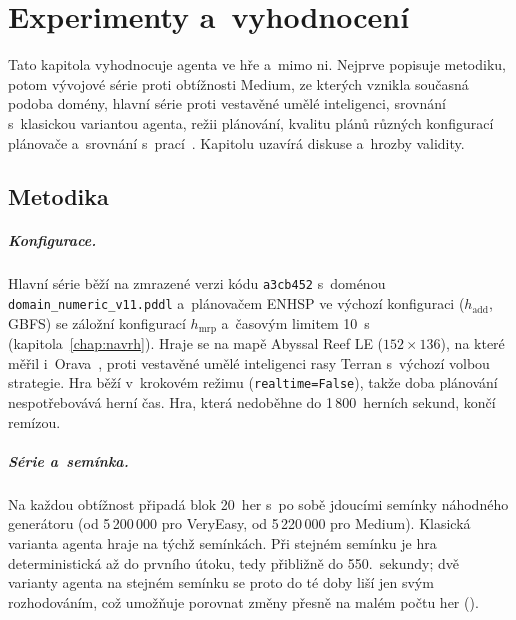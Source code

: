 \chapter{Experimenty a~vyhodnocení}
\label{chap:experimenty}


Tato kapitola vyhodnocuje agenta ve hře a~mimo ni. Nejprve popisuje metodiku, potom vývojové série proti obtížnosti Medium, ze kterých vznikla současná podoba domény, hlavní série proti vestavěné umělé inteligenci, srovnání s~klasickou variantou agenta, režii plánování, kvalitu plánů různých konfigurací plánovače a~srovnání s~prací~\cite{Orava2025}. Kapitolu uzavírá diskuse a~hrozby validity.

\section{Metodika}
\label{sec:metodika}

\paragraph{Konfigurace.} Hlavní série běží na zmrazené verzi kódu \texttt{a3cb452} s~doménou \texttt{domain\_numeric\_v11.pddl} a~plánovačem ENHSP ve výchozí konfiguraci ($h_{\mathrm{add}}$, GBFS) se záložní konfigurací $h_{\mathrm{mrp}}$ a~časovým limitem 10~s (kapitola~\ref{chap:navrh}). Hraje se na mapě Abyssal Reef LE ($152 \times 136$), na které měřil i~Orava~\cite{Orava2025}, proti vestavěné umělé inteligenci rasy Terran s~výchozí volbou strategie. Hra běží v~krokovém režimu (\texttt{realtime=False}), takže doba plánování nespotřebovává herní čas. Hra, která nedoběhne do 1\,800~herních sekund, končí remízou.

\paragraph{Série a~semínka.} Na každou obtížnost připadá blok 20~her s~po sobě jdoucími semínky náhodného generátoru (od 5\,200\,000 pro VeryEasy, od 5\,220\,000 pro Medium). Klasická varianta agenta hraje na týchž semínkách. Při stejném semínku je hra deterministická až do prvního útoku, tedy přibližně do 550.~sekundy; dvě varianty agenta na stejném semínku se proto do té doby liší jen svým rozhodováním, což umožňuje porovnat změny přesně na malém počtu her ().

